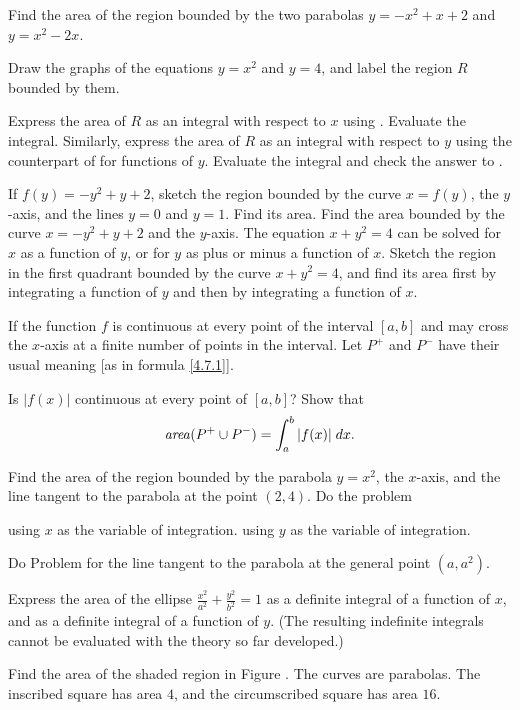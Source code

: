 \begin{exercises}
Find the area of the region bounded by the two parabolas
$y = -x^2 + x + 2$ and $y = x^2 - 2x$.

Draw the graphs of the equations $y = x^2$
and $y = 4$, and label the region $R$ bounded by them.
\begin{exenum}
\x
{}
Express the area of $R$ as an integral with respect
to $x$ using .
Evaluate the integral.
\x
Similarly, express the area of $R$ as an integral with
respect to $y$ using the counterpart of 
for functions of $y$.  Evaluate the integral and
check the answer to .
\end{exenum}

\begin{exenum}
\x
If $f(y) = -y^2 + y + 2$, sketch the region bounded
by the curve $x = f(y)$, the $y$-axis,
and the lines $y = 0$ and $y = 1$.
Find its area.
\x
Find the area bounded by the curve
$x = -y^2 + y + 2$ and the $y$-axis.
\x
The equation $x + y^2 = 4$ can be solved for $x$
as a function of $y$, or for $y$ as plus or minus a
function of $x$.  Sketch the region in the first quadrant
bounded by the curve $x + y^2 = 4$, and find its area
first by integrating a function of $y$ and then by
integrating a function of $x$.
\end{exenum}

If the function $f$ is continuous at every point of the
interval $[a,b]$ and may cross the $x$-axis at a
finite number of points in the interval.
Let $P^+$ and $P^-$ have their usual meaning
[as in formula \eqref{4.7.1}].
\begin{exenum}
\x
Is $|f(x)|$ continuous at every point of $[a,b]$?
\x
Show that
\[
\mbox{\emph{area}}(P^+ \cup P^-) =
\int_a^b |f(x)| \; dx
.
\]
\end{exenum}

Find the area of the region bounded by the parabola
$y = x^2$, the $x$-axis, and the line tangent
to the parabola at the point $(2, 4)$.
Do the problem
\begin{exenum}
\x
using $x$ as the variable of integration.
\x
using $y$ as the variable of integration.
\end{exenum}

Do Problem  for the line tangent to the
parabola at the general point $(a, a^2)$.

Express the area of the ellipse
$\frac{x^2}{a^2} + \frac{y^2}{b^2} = 1$
as a definite integral of a function of $x$,
and as a definite integral of a function of $y$.
(The resulting indefinite integrals cannot
be evaluated with the theory so far developed.)

Find the area of the shaded region in Figure .
The curves are parabolas.  The inscribed square
has area $4$, and the circumscribed square has
area $16$.

\end{exercises}
